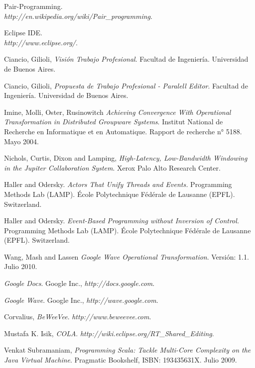 \documentclass[12pt,a4paper]{article}
\begin{document}
\newpage
\begin{thebibliography}{9}
	Pair-Programming. \\
	\textsl{http://en.wikipedia.org/wiki/Pair\_programming}.

	Eclipse IDE. \\
	\textsl{http://www.eclipse.org/}.

	Ciancio, Gilioli,
	\emph{Visión Trabajo Profesional}.
	Facultad de Ingeniería.
	Universidad de Buenos Aires. 

	Ciancio, Gilioli,
	\emph{Propuesta de Trabajo Profesional - Paralell Editor}.
	Facultad de Ingeniería.
	Universidad de Buenos Aires. 

	Imine, Molli, Oster, Rusinowitch
	\emph{Achieving Convergence With Operational Transformation in Distributed Groupware Systems}.
	Institut National de Recherche en Informatique et en Automatique.
	Rapport de recherche n° 5188. 
	Mayo 2004.

	Nichols, Curtis, Dixon and Lamping,
	\emph{High-Latency, Low-Bandwidth Windowing in the Jupiter Collaboration System}.
	Xerox Palo Alto Research Center.

	Haller and Odersky.
	\emph{Actors That Unify Threads and Events.}
	Programming Methods Lab (LAMP).
	École Polytechnique Fédérale de Lausanne (EPFL).
	Switzerland.
 
	Haller and Odersky.
	\emph{Event-Based Programming without Inversion of Control.}
	Programming Methods Lab (LAMP).
	École Polytechnique Fédérale de Lausanne (EPFL).
	Switzerland.

	Wang, Mash and Lassen
	\emph{Google Wave Operational Transformation}.
	Versión: 1.1.
	Julio 2010.
	
	\emph{Google Docs}. 
	Google Inc., 
	\textsl{http://docs.google.com}.
	
	\emph{Google Wave}. Google Inc., 
	\textsl{http://wave.google.com}.

	Corvalius,
	\emph{BeWeeVee}. 
	\textsl{http://www.beweevee.com}.
	
	Mustafa K. Isik,
	\emph{COLA}. 
	\textsl{ http://wiki.eclipse.org/RT\_Shared\_Editing}.

	Venkat Subramaniam,
	\emph{Programming Scala: Tackle Multi-Core Complexity on the Java Virtual Machine}.
	Pragmatic Bookshelf, ISBN: 193435631X.
	Julio 2009.


\end{thebibliography}
\end{document}
